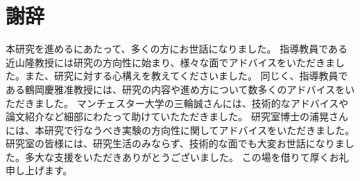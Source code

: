 \documentclass[a4, 10pt,dvipdfmx]{jsarticle}
\begin{document}


\newpage
{}
\section*{謝辞}

本研究を進めるにあたって、多くの方にお世話になりました。
指導教員である近山隆教授には研究の方向性に始まり、様々な面でアドバイスをいただきました。また、研究に対する心構えを教えてくださいました。
同じく、指導教員である鶴岡慶雅准教授には、研究の内容や進め方について数多くのアドバイスをいただきました。
マンチェスター大学の三輪誠さんには、技術的なアドバイスや論文紹介など細部にわたって助けていたただきました。
研究室博士の浦晃さんには、本研究で行なうべき実験の方向性に関してアドバイスをいただきました。  
研究室の皆様には、研究生活のみならず、技術的な面でも大変お世話になりました。多大な支援をいただきありがとうございました。
この場を借りて厚くお礼申し上げます。

\newpage
{}



\end{document}
